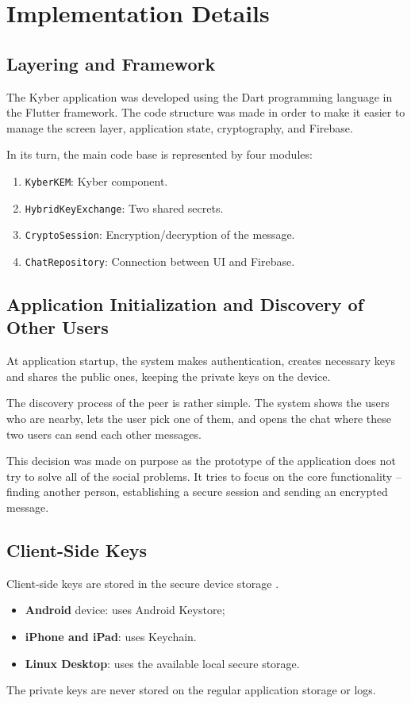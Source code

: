 \section{Implementation Details}

\subsection{Layering and Framework}
The Kyber application was developed using the Dart programming language in the Flutter framework. The code structure was made in order to make it easier to manage the screen layer, application state, cryptography, and Firebase.

In its turn, the main code base is represented by four modules:
\begin{enumerate}
    \item \texttt{KyberKEM}: Kyber component.
    \item \texttt{HybridKeyExchange}: Two shared secrets.
    \item \texttt{CryptoSession}: Encryption/decryption of the message.
    \item \texttt{ChatRepository}: Connection between UI and Firebase.
\end{enumerate}

\subsection{Application Initialization and Discovery of Other Users}
At application startup, the system makes authentication, creates necessary keys and shares the public ones, keeping the private keys on the device.

The discovery process of the peer is rather simple. The system shows the users who are nearby, lets the user pick one of them, and opens the chat where these two users can send each other messages.

This decision was made on purpose as the prototype of the application does not try to solve all of the social problems. It tries to focus on the core functionality – finding another person, establishing a secure session and sending an encrypted message.

\subsection{Client-Side Keys}
Client-side keys are stored in the secure device storage \cite{bsi_hybrid}.
\begin{itemize}
    \item \textbf{Android} device: uses Android Keystore;
    \item \textbf{iPhone and iPad}: uses Keychain.
    \item \textbf{Linux Desktop}: uses the available local secure storage.
\end{itemize}
The private keys are never stored on the regular application storage or logs.

